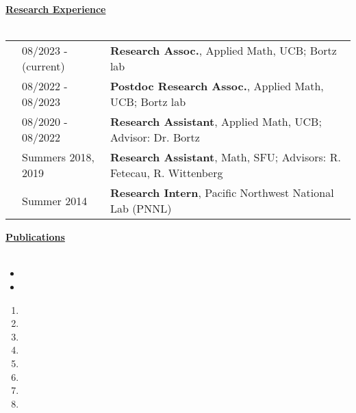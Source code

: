 \documentclass[letterpaper,11pt,oneside]{article}
\newcommand{\headr}[1]{\vspace{10pt}\uline{\Large{\textbf{#1}} \hfill } \\ \vspace{-10pt}\\}
\begin{document}


\headr{Research Experience}

\begin{tabular}{@{} p{0.01cm} @{} p{4cm} @{} p{16cm}@{} }
& 08/2023 - (current)  & 
\textbf{Research Assoc.}, Applied Math, UCB; Bortz lab \\
& 08/2022 - 08/2023 & 
\textbf{Postdoc Research Assoc.}, Applied Math, UCB; Bortz lab\\
& 08/2020 - 08/2022  & 
\textbf{Research Assistant}, Applied Math, UCB; 
Advisor: Dr. Bortz \\
& Summers 2018, 2019  & 
\textbf{Research Assistant}, Math, SFU; Advisors: R. Fetecau, R. Wittenberg \\
& Summer 2014  & 
\textbf{Research Intern}, Pacific Northwest National Lab (PNNL) 
\end{tabular}




\headr{Publications}
\vspace{-0.5cm}
\begin{itemize}
\item {}
\item {}
\end{itemize}
\begin{enumerate}
\item {}
\item {}
\item {}
\item {}
\item {}
\item {}
\item {}
\item {}
\end{enumerate}
\end{document}
